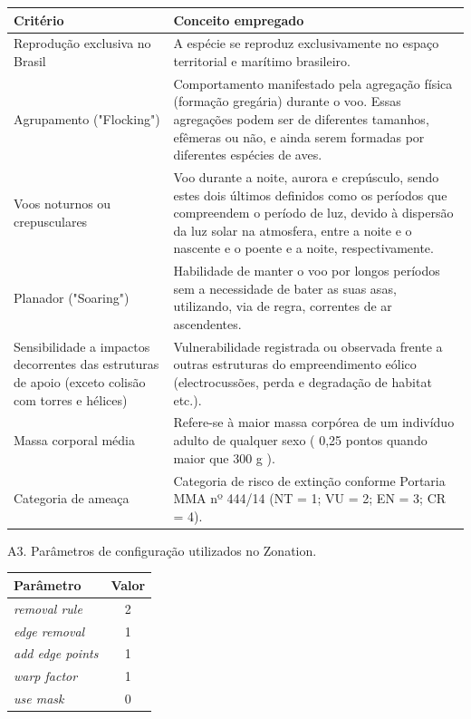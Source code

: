 \documentclass[
  oneside]{scrbook}
\begin{document}
\begin{longtable}[t]{>{\raggedright\arraybackslash}p{5cm}>{\raggedright\arraybackslash}p{10cm}}
\toprule
Critério & Conceito empregado\\
\midrule
Reprodução exclusiva no Brasil & A espécie se reproduz exclusivamente no espaço territorial e marítimo brasileiro.\\
Agrupamento ("Flocking") & Comportamento manifestado pela agregação física (formação gregária) durante o voo. Essas agregações podem ser de diferentes tamanhos, efêmeras ou não, e ainda serem formadas por diferentes espécies de aves.\\
Voos noturnos ou crepusculares & Voo durante a noite, aurora e crepúsculo, sendo estes dois últimos definidos como os períodos que compreendem o período de luz, devido à dispersão da luz solar na atmosfera, entre a noite e o nascente e o poente e a noite, respectivamente.\\
Planador ("Soaring") & Habilidade de manter o voo por longos períodos sem a necessidade de bater as suas asas, utilizando, via de regra, correntes de ar ascendentes.\\
Sensibilidade a impactos decorrentes das estruturas de apoio (exceto colisão com torres e hélices) & Vulnerabilidade registrada ou observada frente a outras estruturas do empreendimento eólico (electrocussões, perda e degradação de habitat etc.).\\
\addlinespace
Massa corporal média & Refere-se à maior massa corpórea de um indivíduo adulto de qualquer sexo ( 0,25 pontos quando maior que 300 g ).\\
Categoria de ameaça & Categoria de risco de extinção conforme Portaria MMA nº 444/14 (NT = 1; VU = 2; EN = 3; CR = 4).\\
\bottomrule
\end{longtable}

A3. Parâmetros de configuração utilizados no Zonation.

\begin{longtable}[t]{>{}lc}
\toprule
Parâmetro & Valor\\
\midrule
\em{removal rule} & 2\\
\em{edge removal} & 1\\
\em{add edge points} & 1\\
\em{warp factor} & 1\\
\em{use mask} & 0\\
\bottomrule
\end{longtable}
\end{document}
